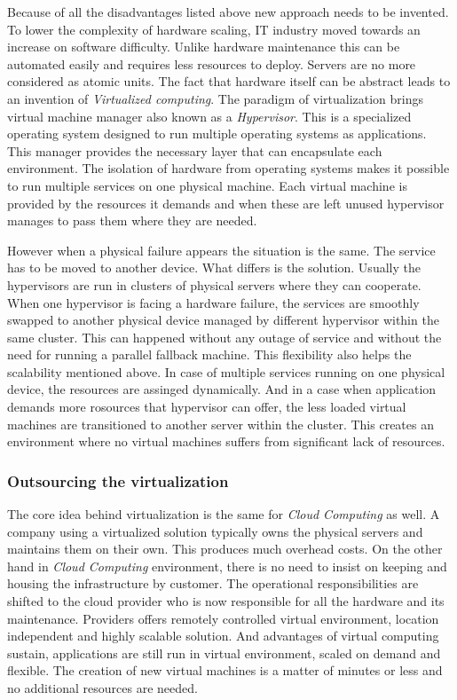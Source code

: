 Because of all the disadvantages listed above new approach needs to be invented. To lower the complexity of hardware scaling, IT industry moved towards an increase on software difficulty. Unlike hardware maintenance this can be automated easily and requires less resources to deploy. Servers are no more considered as atomic units. The fact that hardware itself can be abstract leads to an invention of \emph{Virtualized computing}. The paradigm of virtualization brings virtual machine manager also known as a \emph{Hypervisor}. This is a specialized operating system designed to run multiple operating systems as applications. This manager provides the necessary layer that can encapsulate each environment. The isolation of hardware from operating systems makes it possible to run multiple services on one physical machine. Each virtual machine is provided by the resources it demands and when these are left unused hypervisor manages to pass them where they are needed.

However when a physical failure appears the situation is the same. The service has to be moved to another device. What differs is the solution. Usually the hypervisors are run in clusters of physical servers where they can cooperate. When one hypervisor is facing a hardware failure, the services are smoothly swapped to another physical device managed by different hypervisor within the same cluster. This can happened without any outage of service and without the need for running a parallel fallback machine. This flexibility also helps the scalability mentioned above. In case of multiple services running on one physical device, the resources are assinged dynamically. And in a case when application demands more rosources that hypervisor can offer, the less loaded virtual machines are transitioned to another server within the cluster. This creates an environment where no virtual machines suffers from significant lack of resources.

\subsubsection{Outsourcing the virtualization}
\label{subs:Outsourcing the virtualization}

The core idea behind virtualization is the same for \emph{Cloud Computing} as well. A company using a virtualized solution typically owns the physical servers and maintains them on their own. This produces much overhead costs. On the other hand in \emph{Cloud Computing} environment, there is no need to insist on keeping and housing the infrastructure by customer. The operational responsibilities are shifted to the cloud provider who is now responsible for all the hardware and its maintenance. Providers offers remotely controlled virtual environment, location independent and highly scalable solution. And advantages of virtual computing sustain, applications are still run in virtual environment, scaled on demand and flexible. The creation of new virtual machines is a matter of minutes or less and no additional resources are needed.

